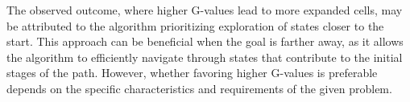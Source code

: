 The observed outcome, where higher G-values lead to more expanded cells, may be attributed to the algorithm prioritizing exploration of states closer to the start. This approach can be beneficial when the goal is farther away, as it allows the algorithm to efficiently navigate through states that contribute to the initial stages of the path. However, whether favoring higher G-values is preferable depends on the specific characteristics and requirements of the given problem.